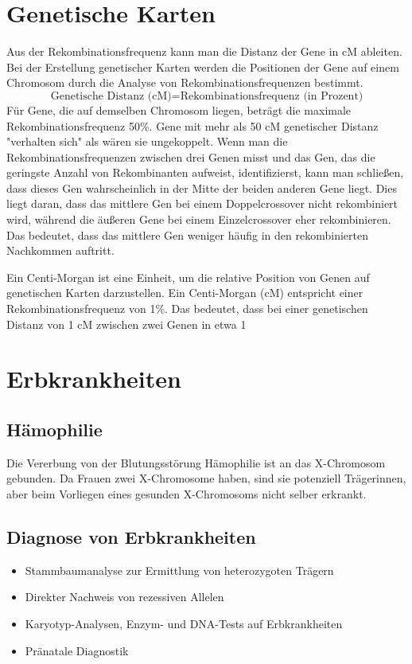 \documentclass{article}
\begin{document}
\section*{Genetische Karten}
Aus der Rekombinationsfrequenz kann man die Distanz der Gene in cM ableiten. Bei der Erstellung genetischer Karten werden die Positionen der Gene auf einem Chromosom durch die Analyse von Rekombinationsfrequenzen bestimmt. 
\[
\text{Genetische Distanz (cM)} = \text{Rekombinationsfrequenz} \text{ (in Prozent)}
\]
Für Gene, die auf demselben Chromosom liegen, beträgt die maximale Rekombinationsfrequenz 50$\%$.  Gene mit mehr als 50 cM
genetischer Distanz "verhalten sich"
als wären sie ungekoppelt. \newline
Wenn man die Rekombinationsfrequenzen zwischen drei Genen misst und das Gen, das die geringste Anzahl von Rekombinanten aufweist, identifizierst, kann man schließen, dass dieses Gen wahrscheinlich in der Mitte der beiden anderen Gene liegt. \newline
Dies liegt daran, dass das mittlere Gen bei einem Doppelcrossover nicht rekombiniert wird, während die äußeren Gene bei einem Einzelcrossover eher rekombinieren. Das bedeutet, dass das mittlere Gen weniger häufig in den rekombinierten Nachkommen auftritt.
 
\begin{mybox}[title={Centi-Morgan (cM)}]
Ein Centi-Morgan ist eine Einheit, um die relative Position von Genen auf genetischen Karten darzustellen. \newline
Ein Centi-Morgan (cM) entspricht einer Rekombinationsfrequenz von 1$\%$. Das bedeutet, dass bei einer genetischen Distanz von 1 cM zwischen zwei Genen in etwa 1%
\end{mybox}


\section*{Erbkrankheiten}
\subsection*{Hämophilie}
Die Vererbung von der Blutungsstörung Hämophilie ist an das X-Chromosom gebunden. Da Frauen zwei X-Chromosome haben, sind sie potenziell Trägerinnen, aber beim Vorliegen eines gesunden X-Chromosoms nicht selber erkrankt. 
\subsection*{Diagnose von Erbkrankheiten}
\begin{itemize}
    \item Stammbaumanalyse zur Ermittlung von heterozygoten Trägern
    \item Direkter Nachweis von rezessiven Allelen
    \item Karyotyp-Analysen, Enzym- und DNA-Tests auf Erbkrankheiten
    \item Pränatale Diagnostik
\end{itemize}
\end{document}

